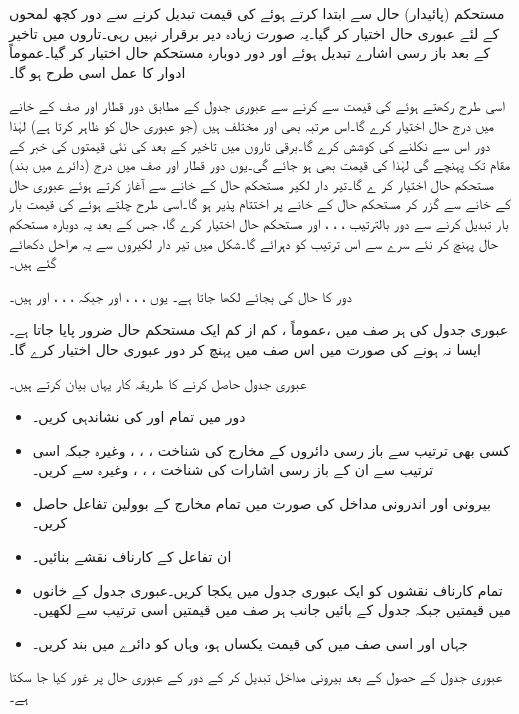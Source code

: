  مستحکم (پائیدار) حال سے ابتدا کرتے ہوئے  کی قیمت تبدیل کرنے سے دور کچھ لمحوں کے لئے عبوری حال اختیار کر گیا۔یہ صورت زیادہ دیر برقرار نہیں رہی۔تاروں میں تاخیر کے بعد باز رسی اشارے تبدیل ہوئے اور دور دوبارہ مستحکم حال اختیار کر گیا۔عموماً ادوار کا عمل اسی طرح ہو گا۔

اسی طرح  رکھتے ہوئے  کی قیمت  سے  کرنے سے عبوری جدول کے مطابق دور  قطار اور  صف کے خانے میں درج حال  اختیار کرے گا۔اس مرتبہ بھی  اور  مختلف ہیں (جو عبوری حال کو ظاہر کرتا ہے) لہٰذا دور اس سے نکلنے کی کوشش کرے گا۔برقی تاروں میں تاخیر کے بعد  کی نئی قیمتوں کی خبر  کے مقام تک پہنچے گی لہٰذا  کی قیمت بھی  ہو جائے گی۔یوں دور  قطار اور  صف میں درج (دائرے میں بند) مستحکم حال  اختیار کر ے گا۔تیر دار لکیر مستحکم حال  کے خانے سے  آغاز کرتے ہوئے عبوری حال  کے خانے سے گزر کر مستحکم حال  کے خانے پر اختتام پذیر ہو گا۔اسی طرح چلتے ہوئے  کی قیمت بار بار تبدیل کرنے سے دور بالترتیب  ، ، ، اور  مستحکم حال اختیار کرے گا، جس کے بعد یہ  دوبارہ مستحکم حال  پہنچ کر نئے سرے سے اس ترتیب کو دہرائے گا۔شکل میں تیر دار لکیروں سے یہ مراحل دکھائے گئے ہیں۔

 دور کا حال  کی بجائے  لکھا جاتا ہے۔ یوں ، ، ، اور  جبکہ ، ، ، اور  ہیں۔
 
عبوری جدول کی ہر صف میں ،عموماً ، کم از کم ایک مستحکم حال ضرور پایا جاتا ہے۔ایسا نہ ہونے کی صورت میں اس صف میں پہنچ کر دور عبوری حال اختیار کرے گا۔

عبوری جدول حاصل کرنے کا طریقہ کار یہاں بیان کرتے ہیں۔
\begin{itemize}
\item
دور میں تمام اور  کی نشاندہی کریں۔
\item
 کسی بھی ترتیب سے باز رسی دائروں کے مخارج کی شناخت ، ، ، وغیرہ جبکہ اسی ترتیب سے ان کے باز رسی اشارات کی شناخت ، ، ، وغیرہ سے کریں۔
\item
 بیرونی اور اندرونی مداخل کی صورت میں تمام مخارج کے بوولین تفاعل حاصل کریں۔
\item 
 ان تفاعل کے کارناف نقشے بنائیں۔
\item 
 تمام کارناف نقشوں کو ایک عبوری جدول میں یکجا کریں۔عبوری جدول کے خانوں میں  قیمتیں جبکہ جدول کے بائیں جانب ہر صف میں  قیمتیں اسی ترتیب سے لکھیں۔
\item 
 جہاں  اور اسی صف میں  کی قیمت یکساں ہو، وہاں  کو دائرے میں بند کریں۔
 \end{itemize}
عبوری جدول کے حصول کے بعد بیرونی مداخل تبدیل کر کے دور کے عبوری حال پر غور کیا جا سکتا ہے۔ 

